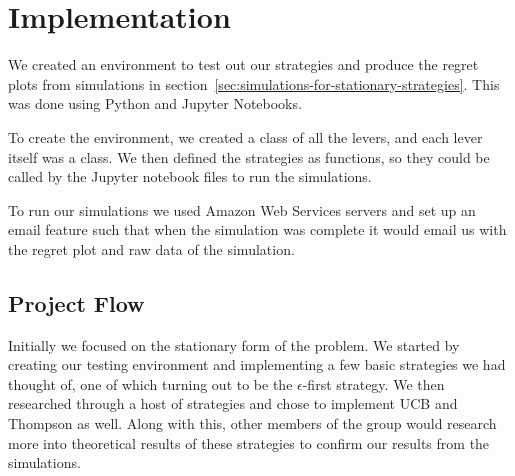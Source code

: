 \section{Implementation}\label{sec:implementation}

We created an environment to test out our strategies and produce the regret plots from simulations in section~\ref{sec:simulations-for-stationary-strategies}.
This was done using Python and Jupyter Notebooks.

To create the environment, we created a class of all the levers, and each lever itself was a class.
We then defined the strategies as functions, so they could be called by the Jupyter notebook files to run the simulations.

To run our simulations we used Amazon Web Services servers and set up an email feature such that when the simulation was complete it would email us with the regret plot and raw data of the simulation.

\subsection{Project Flow}\label{subsec:project-flow}

Initially we focused on the stationary form of the problem.
We started by creating our testing environment and implementing a few basic strategies we had thought of, one of which turning out to be the $\epsilon$-first strategy.
We then researched through a host of strategies and chose to implement UCB and Thompson as well.
Along with this, other members of the group would research more into theoretical results of these strategies to confirm our results from the simulations.